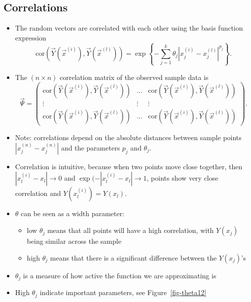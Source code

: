 \documentclass[
  letterpaper,
  DIV=11,
  numbers=noendperiod]{scrreprt}
\providecommand{\tightlist}{%
  \setlength{\itemsep}{0pt}\setlength{\parskip}{0pt}}\usepackage{longtable,booktabs,array}
\begin{document}
\hypertarget{correlations}{%
\subsection{Correlations}\label{correlations}}

\begin{itemize}
\item
  The random vectors are correlated with each other using the basis
  function expression
  \[\text{cor} \left(\vec{Y}(\vec{x}^{(i)}),\vec{Y}(\vec{x}^{(l)}) \right) = \exp\left\{ - \sum_{j=1}^k \theta_j |x_j^{(i)} - x_j^{(l)} |^{p_j}\right\}.\]
\item
  The \((n \times n)\) correlation matrix of the observed sample data is
  \[\vec{\Psi} = \begin{pmatrix}
  \text{cor}\left(
  \vec{Y}(\vec{x}^{(i)}),
  \vec{Y}(\vec{x}^{(l)}) 
  \right) & \ldots &
  \text{cor}\left(
  \vec{Y}(\vec{x}^{(i)}),
  \vec{Y}(\vec{x}^{(l)}) 
  \right)\\
  \vdots  & \vdots &  \vdots\\
   \text{cor}\left(
  \vec{Y}(\vec{x}^{(i)}),
  \vec{Y}(\vec{x}^{(l)}) 
  \right)&
  \ldots &
  \text{cor}\left(
  \vec{Y}(\vec{x}^{(i)}),
  \vec{Y}(\vec{x}^{(l)}) 
  \right)
  \end{pmatrix}.\]
\item
  Note: correlations depend on the absolute distances between sample
  points \(|x_j^{(n)} - x_j^{(n)}|\) and the parameters \(p_j\) and
  \(\theta_j\).
\item
  Correlation is intuitive, because when two points move close together,
  then \(|x_l^{(i)} - x_l| \to 0\) and
  \(\exp(-|x_l^{(i)} - x_l| \to 1\), points show very close correlation
  and \(Y(x_l^{(i)}) = Y(x_l)\).
\item
  \(\theta\) can be seen as a width parameter:

  \begin{itemize}
  \tightlist
  \item
    low \(\theta_j\) means that all points will have a high correlation,
    with \(Y(x_j)\) being similar across the sample
  \item
    high \(\theta_j\) means that there is a significant difference
    between the \(Y(x_j)\)'s
  \end{itemize}
\item
  \(\theta_j\) is a measure of how active the function we are
  approximating is
\item
  High \(\theta_j\) indicate important parameters, see
  Figure~\ref{fig-theta12}
\end{itemize}
\end{document}
